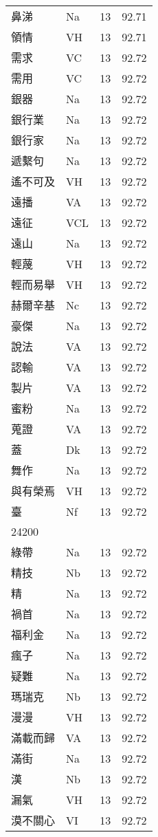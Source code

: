 \documentclass[twocolumn]{book}
\begin{document}
\begin{supertabular}{llrr}
鼻涕 & Na & 13 &  92.71\\
領情 & VH & 13 &  92.71\\
需求 & VC & 13 &  92.72\\
需用 & VC & 13 &  92.72\\
銀器 & Na & 13 &  92.72\\
銀行業 & Na & 13 &  92.72\\
銀行家 & Na & 13 &  92.72\\
遞繫句 & Na & 13 &  92.72\\
遙不可及 & VH & 13 &  92.72\\
遠播 & VA & 13 &  92.72\\
遠征 & VCL & 13 &  92.72\\
遠山 & Na & 13 &  92.72\\
輕蔑 & VH & 13 &  92.72\\
輕而易舉 & VH & 13 &  92.72\\
赫爾辛基 & Nc & 13 &  92.72\\
豪傑 & Na & 13 &  92.72\\
說法 & VA & 13 &  92.72\\
認輸 & VA & 13 &  92.72\\
製片 & VA & 13 &  92.72\\
蜜粉 & Na & 13 &  92.72\\
蒐證 & VA & 13 &  92.72\\
蓋 & Dk & 13 &  92.72\\
舞作 & Na & 13 &  92.72\\
與有榮焉 & VH & 13 &  92.72\\
臺 & Nf & 13 &  92.72\\
24200\\
綠帶 & Na & 13 &  92.72\\
精技 & Nb & 13 &  92.72\\
精 & Na & 13 &  92.72\\
禍首 & Na & 13 &  92.72\\
福利金 & Na & 13 &  92.72\\
瘋子 & Na & 13 &  92.72\\
疑難 & Na & 13 &  92.72\\
瑪瑞克 & Nb & 13 &  92.72\\
漫漫 & VH & 13 &  92.72\\
滿載而歸 & VA & 13 &  92.72\\
滿街 & Na & 13 &  92.72\\
漢 & Nb & 13 &  92.72\\
漏氣 & VH & 13 &  92.72\\
漠不關心 & VI & 13 &  92.72\\

\end{supertabular}
\end{document}
